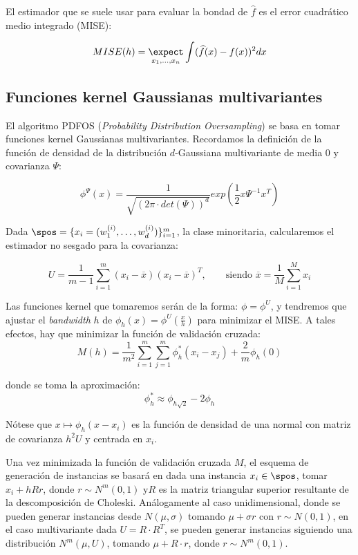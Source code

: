 El estimador que se suele usar para evaluar la bondad de $\widehat{f}$ es el error cuadrático medio integrado (MISE):

\[MISE(h) = \underset{x_1, \ldots, x_n}{\expect} \int (\widehat{f}(x) - f(x))^2 dx\]



\subsection{Funciones kernel Gaussianas multivariantes}
El algoritmo PDFOS (\textit{Probability Distribution Oversampling}) se basa en tomar funciones kernel Gaussianas multivariantes.
Recordamos la definición de la función de densidad de la distribución $d$-Gaussiana multivariante de media $0$ y covarianza $\Psi$:

\[\phi^{\Psi}(x) = \frac{1}{\sqrt{(2\pi \cdot det(\Psi))^d}} exp\left(\frac{1}{2} x \Psi^{-1} x^T \right)\]

Dada $\spos = \{x_i = (w_1^{(i)}, \ldots, w_d^{(i)})\}_{i=1}^m$, la clase minoritaria, calcularemos el estimador no sesgado 
para la covarianza:

\[U = \frac{1}{m-1} \sum_{i=1}^m (x_i - \overline{x})(x_i - \overline{x})^T, 
  \qquad \textrm{siendo } \overline{x} = \frac{1}{M}\sum_{i=1}^M x_i\]
  
Las funciones kernel que tomaremos serán de la forma: $\phi = \phi^{U}$, y tendremos que ajustar el \textit{bandwidth} $h$ de
$\phi_h(x) = \phi^U\left(\frac{x}{h}\right)$ para minimizar el MISE. A tales efectos, hay que minimizar la función de validación
cruzada:
\begin{equation}
 M(h) = \frac{1}{m^2} \sum_{i=1}^m \sum_{j=1}^m \phi_h^{\ast} (x_i - x_j) + \frac{2}{m} \phi_h(0)
 \label{eq:cross-val}
\end{equation}

donde se toma la aproximación:
\[\phi_h^{\ast} \approx \phi_{h\sqrt{2}} - 2\phi_h\]

Nótese que $x\mapsto \phi_h(x-x_i)$ es la función de densidad de una normal con matriz de covarianza $h^2 U$ y centrada en $x_i$.

Una vez minimizada la función de validación cruzada $M$, el esquema de generación de instancias se basará en dada una instancia
$x_i \in \spos$, tomar $x_i + h R r$, donde $r\sim N^m(0,1)$ y$R$ es la matriz triangular superior resultante de la descomposición
de Choleski. Análogamente al caso unidimensional, donde se pueden generar instancias desde $N(\mu, \sigma)$ tomando $\mu + \sigma r$
con $r\sim N(0,1)$, en el caso multivariante dada $U =  R \cdot R^T$, se pueden generar instancias siguiendo una distribución $N^m(\mu, U)$,
tomando $\mu + R \cdot r$, donde $r\sim N^m(0,1)$.

